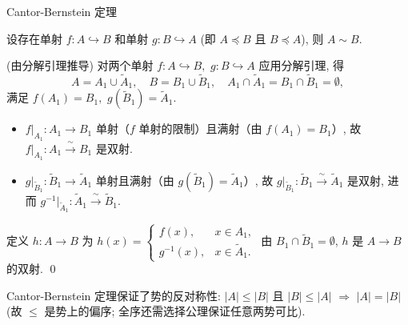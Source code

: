 \begin{frame}{Cantor-Bernstein 定理}

\begin{thm}
设存在单射 $f: A \hookrightarrow B$ 和单射 $g: B \hookrightarrow A$ (即 $A \preccurlyeq B$ 且 $B \preccurlyeq A$), 则 $A \sim B$.
\end{thm}

\pause
\vspace{0.3em}

\startproof[bg=yellow, fg=red](由分解引理推导)
对两个单射 $f: A \hookrightarrow B,$ $g: B \hookrightarrow A$ 应用分解引理, 得
\[
A = A_1 \cup \widetilde{A}_1, \quad B = B_1 \cup \widetilde{B}_1, \quad A_1 \cap \widetilde{A}_1 = B_1 \cap \widetilde{B}_1 = \emptyset,
\]
满足 $f(A_1) = B_1,$ $g(\widetilde{B}_1) = \widetilde{A}_1.$

\pause

\begin{itemize}
\item $f|_{A_1}: A_1 \to B_1$ 单射（$f$ 单射的限制）且满射（由 $f(A_1)=B_1$）, 故 $f|_{A_1}: A_1 \xrightarrow{\;\sim\;} B_1$ 是双射.
\item $g|_{\widetilde{B}_1}: \widetilde{B}_1 \to \widetilde{A}_1$ 单射且满射（由 $g(\widetilde{B}_1)=\widetilde{A}_1$）, 故 $g|_{\widetilde{B}_1}: \widetilde{B}_1 \xrightarrow{\;\sim\;} \widetilde{A}_1$ 是双射, 进而 $g^{-1}|_{\widetilde{A}_1}: \widetilde{A}_1 \xrightarrow{\;\sim\;} \widetilde{B}_1$.
\end{itemize}

\pause

定义 $h: A \to B$ 为 $h(x) = \begin{cases} f(x), & x \in A_1, \\ g^{-1}(x), & x \in \widetilde{A}_1. \end{cases}$ 由 $B_1 \cap \widetilde{B}_1 = \emptyset$, $h$ 是 $A \to B$ 的双射.
\qed

\pause
\vspace{0.4em}

\begin{remark}
Cantor-Bernstein 定理保证了势的\alert{反对称性}: $|A| \leqslant |B|$ 且 $|B| \leqslant |A|$ $\Rightarrow$ $|A| = |B|$ (故 $\leqslant$ 是势上的\alert{偏序}; \alert{全序}还需选择公理保证任意两势可比).
\end{remark}

\end{frame}


